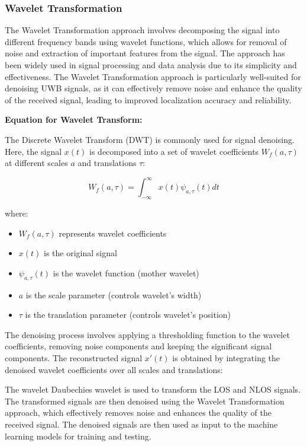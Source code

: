 \documentclass[
	article, %
	11pt, %
]{CSUniSchoolLabReport}
\begin{document}
\subsubsection{Wavelet Transformation}\label{wavelet_transformation}

The Wavelet Transformation approach involves decomposing the signal into different frequency bands using wavelet functions, which allows for removal of noise and extraction of important features from the signal. The approach has been widely used in signal processing and data analysis due to its simplicity and effectiveness. The Wavelet Transformation approach is particularly well-suited for denoising UWB signals, as it can effectively remove noise and enhance the quality of the received signal, leading to improved localization accuracy and reliability.

\textbf{Equation for Wavelet Transform:}

The Discrete Wavelet Transform (DWT) is commonly used for signal denoising. Here, the signal $x(t)$ is decomposed into a set of wavelet coefficients $W_f(a, \tau)$ at different scales $a$ and translations $\tau$:

\begin{equation}
W_f(a, \tau) = \int_{-\infty}^{\infty} x(t) \psi_{a, \tau}(t) dt
\end{equation}

where:

\begin{itemize}
  \item $W_f(a, \tau)$ represents wavelet coefficients
  \item $x(t)$ is the original signal
  \item $\psi_{a, \tau}(t)$ is the wavelet function (mother wavelet)
  \item $a$ is the scale parameter (controls wavelet's width)
  \item $\tau$ is the translation parameter (controls wavelet's position)
\end{itemize}

The denoising process involves applying a thresholding function to the wavelet coefficients, removing noise components and keeping the significant signal components. The reconstructed signal $x'(t)$ is obtained by integrating the denoised wavelet coefficients over all scales and translations:

The wavelet Daubechies wavelet is used to transform the LOS and NLOS signals. The transformed signals are then denoised using the Wavelet Transformation approach, which effectively removes noise and enhances the quality of the received signal. The denoised signals are then used as input to the machine learning models for training and testing.
\end{document}
